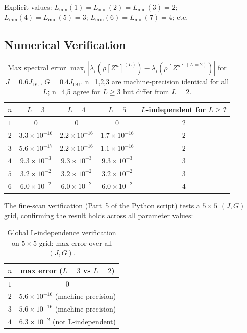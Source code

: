 \documentclass[12pt,a4paper]{article}
\begin{document}
Explicit values: $L_\mathrm{min}(1)=L_\mathrm{min}(2)=L_\mathrm{min}(3)=2$;
$L_\mathrm{min}(4)=L_\mathrm{min}(5)=3$;
$L_\mathrm{min}(6)=L_\mathrm{min}(7)=4$; etc.

\subsection{Numerical Verification}
\label{subsec:lindep_numerical}

\begin{table}[h]
\centering
\caption{Max spectral error $\max_i|\lambda_i(\rho[Z^n]^{(L)})-\lambda_i(\rho[Z^n]^{(L=2)})|$
for $J=0.6J_\mathrm{DU}$, $G=0.4J_\mathrm{DU}$.
n=1,2,3 are machine-precision identical for all $L$;
n=4,5 agree for $L\geq3$ but differ from $L=2$.}
\label{tab:lindep}
\begin{tabular}{c|ccc|c}
\hline
$n$ & $L=3$ & $L=4$ & $L=5$ & $L$-independent for $L\geq$? \\
\hline
$1$ & $0$ & $0$ & $0$ & $2$ \\
$2$ & $3.3\times10^{-16}$ & $2.2\times10^{-16}$ & $1.7\times10^{-16}$ & $2$ \\
$3$ & $5.6\times10^{-17}$ & $2.2\times10^{-16}$ & $1.1\times10^{-16}$ & $2$ \\
$4$ & $9.3\times10^{-3}$ & $9.3\times10^{-3}$ & $9.3\times10^{-3}$ & $3$ \\
$5$ & $3.2\times10^{-2}$ & $3.2\times10^{-2}$ & $3.2\times10^{-2}$ & $3$ \\
$6$ & $6.0\times10^{-2}$ & $6.0\times10^{-2}$ & $6.0\times10^{-2}$ & $4$ \\
\hline
\end{tabular}
\end{table}

The fine-scan verification (Part~5 of the Python script) tests a $5\times5$ $(J,G)$ grid,
confirming the result holds across all parameter values:

\begin{table}[h]
\centering
\caption{Global L-independence verification on $5\times5$ grid: max error over all $(J,G)$.}
\label{tab:lindep_global}
\begin{tabular}{cc}
\hline
$n$ & max error ($L=3$ vs $L=2$) \\
\hline
$1$ & $0$ \\
$2$ & $5.6\times10^{-16}$ (machine precision) \\
$3$ & $5.6\times10^{-16}$ (machine precision) \\
$4$ & $6.3\times10^{-2}$ (not L-independent) \\
\hline
\end{tabular}
\end{table}
\end{document}

